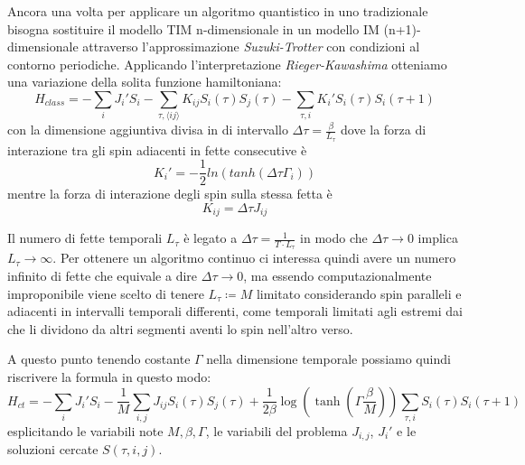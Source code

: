 Ancora una volta per applicare un algoritmo quantistico in uno tradizionale bisogna sostituire il modello TIM n-dimensionale in un modello IM (n+1)-dimensionale attraverso l'approssimazione \textit{Suzuki-Trotter} con condizioni al contorno periodiche.
Applicando l'interpretazione \textit{Rieger-Kawashima} otteniamo una variazione della solita funzione hamiltoniana:
$$H_{class} = - \sum_{i} J_{i}' S_i - \sum_{\tau,\langle ij \rangle} K_{ij} S_i(\tau) S_j(\tau) - \sum_{\tau, i} K_{i}' S_i(\tau) S_i(\tau+1)$$
con la dimensione aggiuntiva divisa in  di intervallo $\Delta\tau = \frac{\beta}{L_{\tau}}$
dove la forza di interazione tra gli spin adiacenti in fette consecutive è
$$K_{i}' = - \frac{1}{2} ln( tanh( \Delta \tau \Gamma_i) )$$
mentre la forza di interazione degli spin sulla stessa fetta è
$$K_{ij} = \Delta \tau J_{ij}$$

Il numero di fette temporali $L_{\tau}$ è legato a $\Delta \tau = \frac{1}{T \cdot L_{\tau}}$ in modo che $\Delta \tau \to 0$ implica $L_{\tau} \to \infty$.
Per ottenere un algoritmo continuo ci interessa quindi avere un numero infinito di fette che equivale a dire $\Delta \tau \to 0$, ma essendo computazionalmente improponibile viene scelto di tenere $L_{\tau} \coloneqq M$ limitato considerando spin paralleli e adiacenti in intervalli temporali differenti, come  temporali limitati agli estremi dai  che li dividono da altri segmenti aventi lo spin nell'altro verso.

A questo punto tenendo costante $\Gamma$ nella dimensione temporale possiamo quindi riscrivere la formula in questo modo:
$$H_{ct} = - \sum_{i} J_{i}' S_i - \frac{1}{M} \sum_{i,j} J_{ij} S_i(\tau) S_j(\tau) + \frac{1}{2 \beta} \log{(\tanh{(\Gamma \frac{\beta}{M})})} \sum_{\tau, i} S_i(\tau) S_i(\tau+1)$$
esplicitando le variabili note $M, \beta, \Gamma$, le variabili del problema $J_{i,j}$, $J_{i}'$ e le soluzioni cercate $S(\tau,i,j)$.

